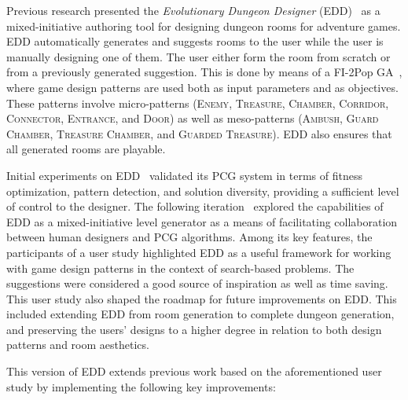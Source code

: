 Previous research presented the \emph{Evolutionary Dungeon Designer} (EDD)~ as a mixed-initiative authoring tool for designing dungeon rooms for adventure games. EDD automatically generates and suggests rooms to the user while the user is manually designing one of them. The user either form the room from scratch or from a previously generated suggestion. This is done by means of a FI-2Pop GA~, where game design patterns are used both as input parameters and as objectives. These patterns involve micro-patterns (\textsc{Enemy}, \textsc{Treasure}, \textsc{Chamber}, \textsc{Corridor}, \textsc{Connector}, \textsc{Entrance}, and \textsc{Door}) as well as meso-patterns (\textsc{Ambush}, \textsc{Guard Chamber}, \textsc{Treasure Chamber}, and \textsc{Guarded Treasure}). EDD also ensures that all generated rooms are playable.

Initial experiments on EDD~ validated its PCG system in terms of fitness optimization, pattern detection, and solution diversity, providing a sufficient level of control to the designer. The following iteration~ explored the capabilities of EDD as a mixed-initiative level generator as a means of facilitating collaboration between human designers and PCG algorithms. Among its key features, the participants of a user study highlighted EDD as a useful framework for working with game design patterns in the context of search-based problems. The suggestions were considered a good source of inspiration as well as time saving. This user study also shaped the roadmap for future improvements on EDD. This included extending EDD from room generation to complete dungeon generation, and preserving the users' designs to a higher degree in relation to both design patterns and room aesthetics.

This version of EDD extends previous work based on the aforementioned user study by implementing the following key improvements:

